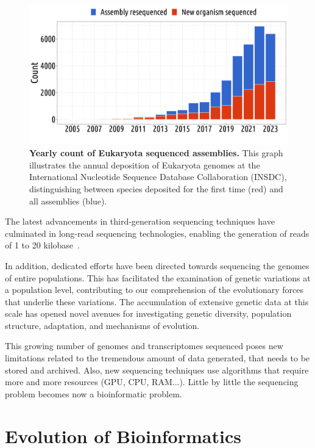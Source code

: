 \begin{figure}[h]
    \centering
    \includegraphics[width=\linewidth]{figures/nb_assembly_insdc.jpg}
    \caption[Yearly count of Eukaryota sequenced assemblies]{\textbf{Yearly count of Eukaryota sequenced assemblies.} This graph illustrates the annual deposition of Eukaryota genomes at the International Nucleotide Sequence Database Collaboration (INSDC), distinguishing between species deposited for the first time (red) and all assemblies (blue).\newline}
    \label{fig:nbassemblyinsdc}
\end{figure}

The latest advancements in third-generation sequencing techniques have culminated in long-read sequencing technologies, enabling the generation of reads of 1 to 20 kilobase~\citep{marx_method_2023, logsdon_long-read_2020}.

In addition, dedicated efforts have been directed towards sequencing the genomes of entire populations. This has facilitated the examination of genetic variations at a population level, contributing to our comprehension of the evolutionary forces that underlie these variations. The accumulation of extensive genetic data at this scale has opened novel avenues for investigating genetic diversity, population structure, adaptation, and mechanisms of evolution.

This growing number of genomes and transcriptomes sequenced poses new limitations related to the tremendous amount of data generated, that needs to be stored and archived. Also, new sequencing techniques use algorithms that require more and more resources (GPU, CPU, RAM...). Little by little the sequencing problem becomes now a bioinformatic problem.

\section{Evolution of Bioinformatics}

